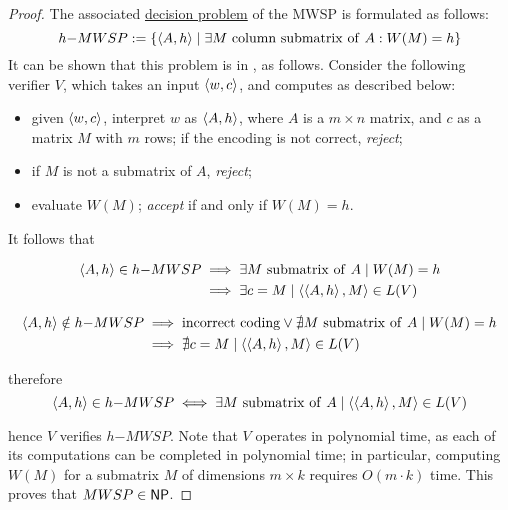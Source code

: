 \begin{proof}
    The associated \href{https://en.wikipedia.org/wiki/Decision_problem}{decision problem} of the MWSP is formulated as follows: $$h\mathrm{-}MWSP := \{\left\langle A,h\right\rangle \mid \exists M \mathrm{\ column \ submatrix \ of \ } A : W(M) = h\}$$ It can be shown that this problem is in \NPclass, as follows. Consider the following verifier $V$, which takes an input $\left\langle w, c\right\rangle$, and computes as described below:

    \begin{itemize}
        \item given $\left\langle w, c\right\rangle$, interpret $w$ as $\left\langle A, h\right\rangle$, where $A$ is a $m \times n$ matrix, and $c$ as a matrix $M$ with $m$ rows; if the encoding is not correct, \textit{reject};
        \item if $M$ is not a submatrix of $A$, \textit{reject};
        \item evaluate $W(M)$; \textit{accept} if and only if $W(M)=h$.
    \end{itemize}

    It follows that

    \begin{equation*}
        \begin{split}
            \left\langle A, h\right\rangle \in h\mathrm{-}MWSP & \implies \exists M \mathrm{\ submatrix \ of \ } A \mid W(M) = h \\
            & \implies \exists c = M \mid \left\langle\left\langle A, h\right\rangle, M\right\rangle \in L(V)
        \end{split}
    \end{equation*}

    \begin{equation*}
        \begin{split}
            \left\langle A, h\right\rangle \notin h\mathrm{-}MWSP & \implies \mathrm{incorrect \ coding} \lor \nexists M \mathrm{\ submatrix \ of \ } A \mid W(M) = h \\
            & \implies \nexists c = M \mid \left\langle\left\langle A, h\right\rangle, M\right\rangle \in L(V)
        \end{split}
    \end{equation*}

    therefore $$\left\langle A, h\right\rangle \in h\mathrm{-}MWSP \iff \exists M \mathrm{\ submatrix \ of \ } A \mid \left\langle\left\langle A, h\right\rangle, M\right\rangle \in L(V)$$

    hence $V$ verifies $h\mathrm{-}MWSP$. Note that $V$ operates in polynomial time, as each of its computations can be completed in polynomial time; in particular, computing $W(M)$ for a submatrix $M$ of dimensions $m \times k$ requires $O(m \cdot k)$ time. This proves that $MWSP \in \textsf{NP}$.


\end{proof}
